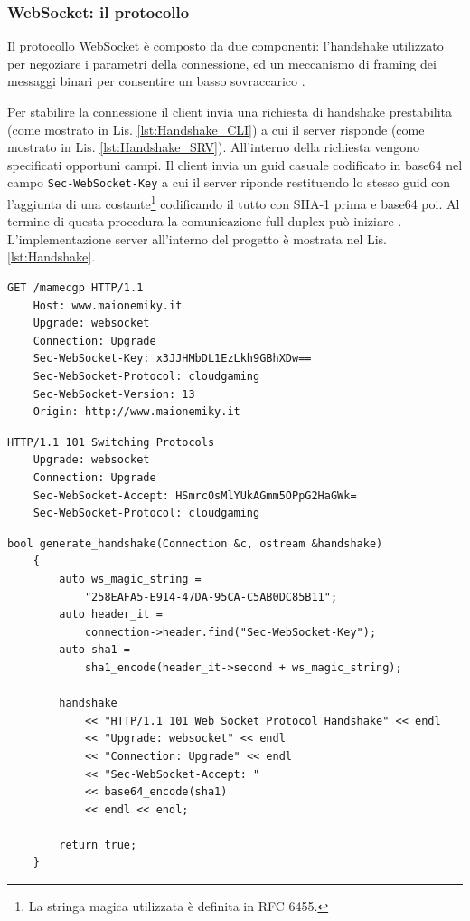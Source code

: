 \subsubsection{WebSocket: il protocollo}
Il protocollo WebSocket è composto da due componenti: l'handshake utilizzato per negoziare i parametri della connessione, ed un meccanismo di framing dei messaggi binari per consentire un basso sovraccarico \parencite{High_Performance_Browser_Networking}.

Per stabilire la connessione il client invia una richiesta di handshake prestabilita (come mostrato in Lis. \ref{lst:Handshake_CLI}) a cui il server risponde (come mostrato in Lis. \ref{lst:Handshake_SRV}). All'interno della richiesta vengono specificati opportuni campi. Il client invia un guid casuale codificato in base64 nel campo \verb|Sec-WebSocket-Key| a cui il server riponde restituendo lo stesso guid con l'aggiunta di una costante\footnote{La stringa magica utilizzata è definita in RFC 6455.} codificando il tutto con SHA-1 prima e base64 poi. Al termine di questa procedura la comunicazione full-duplex può iniziare \parencite{Writing_WebSocket_servers}. L'implementazione server all'interno del progetto è mostrata nel Lis. \ref{lst:Handshake}.

\begin{lstlisting}[language=HTML, caption=Richiesta handshake da parte del client, label={lst:Handshake_CLI}]
	GET /mamecgp HTTP/1.1
	Host: www.maionemiky.it
	Upgrade: websocket
	Connection: Upgrade
	Sec-WebSocket-Key: x3JJHMbDL1EzLkh9GBhXDw==	
	Sec-WebSocket-Protocol: cloudgaming
	Sec-WebSocket-Version: 13
	Origin: http://www.maionemiky.it
\end{lstlisting}

\begin{lstlisting}[language=HTML, caption=Risposta handshake da parte del server, label={lst:Handshake_SRV}]
	HTTP/1.1 101 Switching Protocols
	Upgrade: websocket
	Connection: Upgrade
	Sec-WebSocket-Accept: HSmrc0sMlYUkAGmm5OPpG2HaGWk=
	Sec-WebSocket-Protocol: cloudgaming
\end{lstlisting}

\begin{lstlisting}[caption=Codice dell'handshake implementato, label={lst:Handshake}]
	bool generate_handshake(Connection &c, ostream &handshake)
	{
		auto ws_magic_string =
			"258EAFA5-E914-47DA-95CA-C5AB0DC85B11";
		auto header_it = 
			connection->header.find("Sec-WebSocket-Key");	
		auto sha1 =
			sha1_encode(header_it->second + ws_magic_string);

		handshake
			<< "HTTP/1.1 101 Web Socket Protocol Handshake" << endl
			<< "Upgrade: websocket" << endl
			<< "Connection: Upgrade" << endl
			<< "Sec-WebSocket-Accept: "
			<< base64_encode(sha1)			
			<< endl << endl;

		return true;
	}
\end{lstlisting}

